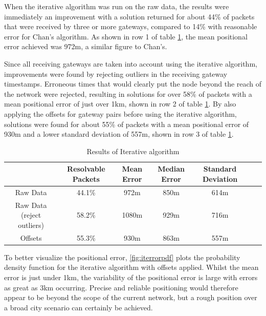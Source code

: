 \documentclass[a4paper]{report}
\begin{document}
    When the iterative algorithm was run on the raw data, the results were immediately an improvement with a solution returned for about 44\% of packets that were received by three or more gateways, compared to 14\% with reasonable error for Chan's algorithm. As shown in row 1 of table \ref{tab:iterresults}, the mean positional error achieved was 972m, a similar figure to Chan's.

    Since all receiving gateways are taken into account using the iterative algorithm, improvements were found by rejecting outliers in the receiving gateway timestamps. Erroneous times that would clearly put the node beyond the reach of the network were rejected, resulting in solutions for over 58\% of packets with a mean positional error of just over 1km, shown in row 2 of table \ref{tab:iterresults}. By also applying the offsets for gateway pairs before using the iterative algorithm, solutions were found for about 55\% of packets with a mean positional error of 930m and a lower standard deviation of 557m, shown in row 3 of table \ref{tab:iterresults}.

    \begin{table}[ht]
      \begin{center}
        \caption{Results of Iterative algorithm}
        \label{tab:iterresults}
        \begin{tabular}{|c|c|c|c|c|c|c|}
          \hline
           & Resolvable Packets & Mean Error & Median Error & Standard Deviation \\
          \hline
          Raw Data & 44.1\% & 972m & 850m & 614m \\
          \hline
          Raw Data (reject outliers) & 58.2\% & 1080m & 929m & 716m \\
          \hline
          Offsets & 55.3\% & 930m & 863m & 557m \\
          \hline
        \end{tabular}
      \end{center}
    \end{table}

    To better visualize the positional error, \ref{fig:iterrorpdf} plots the probability density function for the iterative algorithm with offsets applied. Whilst the mean error is just under 1km, the variability of the positional error is large with errors as great as 3km occurring. Precise and reliable positioning would therefore appear to be beyond the scope of the current network, but a rough position over a broad city scenario can certainly be achieved.
\end{document}
